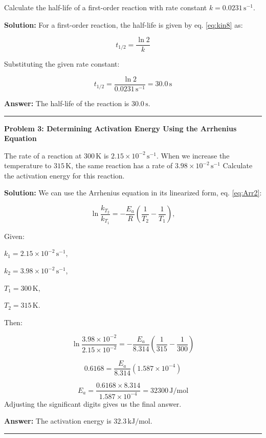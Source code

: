 \documentclass[
  9pt,
]{extbook}
\theoremstyle{definition}
\theoremstyle{definition}
\theoremstyle{definition}
\theoremstyle{definition}
\theoremstyle{remark}
\begin{document}
Calculate the half-life of a first-order reaction with rate constant \(k = 0.0231\,\text{s}^{-1}\).

\textbf{Solution:} For a first-order reaction, the half-life is given by eq. \eqref{eq:kin8} as:

\[t_{1/2} = \frac{\ln 2}{k}\]

Substituting the given rate constant:

\[t_{1/2} = \frac{\ln 2}{0.0231\,\text{s}^{-1}} = 30.0\,\text{s}\]

\textbf{Answer:} The half-life of the reaction is \(30.0\,\text{s}\).

\begin{center}\rule{0.5\linewidth}{0.5pt}\end{center}

\textbf{Problem 3: Determining Activation Energy Using the Arrhenius Equation}

The rate of a reaction at \(300\,\text{K}\) is
\(2.15 \times 10^{-2}\,\text{s}^{-1}\). When we increase the temperature to \(315\,\text{K}\), the same reaction has a rate of \(3.98 \times 10^{-2}\,\text{s}^{-1}\) Calculate the activation energy for this reaction.

\textbf{Solution:} We can use the Arrhenius equation in its linearized form, eq. \eqref{eq:Arr2}:

\[\ln \frac{k_{T_2}}{k_{T_1}}=-\frac{E_a}{R}\left(\frac{1}{T_2}-\frac{1}{T_1}\right),
\]

Given:

\(k_1 = 2.15 \times 10^{-2}\,\text{s}^{-1}\),

\(k_2 = 3.98 \times 10^{-2}\,\text{s}^{-1}\),

\(T_1 = 300\,\text{K}\),

\(T_2 = 315\,\text{K}\).

Then:

\[\ln \frac{3.98 \times 10^{-2}}{2.15 \times 10^{-2}} = -\frac{E_a}{8.314}\left(\frac{1}{315} - \frac{1}{300}\right)\]

\[0.6168 = \frac{E_a}{8.314}(1.587 \times 10^{-4})\]

\[E_a = \frac{0.6168 \times 8.314}{1.587 \times 10^{-4}} = 32300\,\text{J/mol}\]
Adjusting the significant digits gives us the final answer.

\textbf{Answer:} The activation energy is \(32.3\,\text{kJ/mol}\).

\begin{center}\rule{0.5\linewidth}{0.5pt}\end{center}
\end{document}
